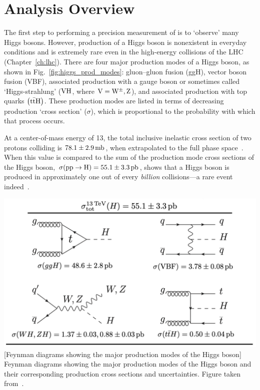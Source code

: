 \section{Analysis Overview}
\label{sec:analysis_overview}
The first step to performing a precision measurement of \mH is to `observe' many Higgs bosons.
However, production of a Higgs boson is nonexistent in everyday conditions and is extremely rare even in the high-energy \pp collisions of the LHC (Chapter~\ref{ch:lhc}).
There are four major production modes of a Higgs boson, as shown in Fig.~\ref{fig:higgs_prod_modes}:
gluon--gluon fusion (ggH),
vector boson fusion (VBF),
associated production with a gauge boson or sometimes called `Higgs-strahlung' ($\mathrm{V} \mathrm{H}$, where $\mathrm{V} = \mathrm{W}^\pm, \text{Z}$),
and associated production with top quarks $\left( \mathrm{t} \bar{\mathrm{t}} \mathrm{H} \right)$.
These production modes are listed in terms of decreasing production `cross section' ($\sigma$), which is proportional to the probability with which that process occurs.

At a center-of-mass energy of 13\TeV, the total inclusive inelastic cross section of two protons colliding is $78.1 \pm 2.9\,\text{mb}$, when extrapolated to the full phase space~\cite{ATLAS:2016ygv}.
When this value is compared to the sum of the production mode cross sections of the Higgs boson, $\sigma(\mathrm{p} \mathrm{p} \to \mathrm{H}) = 55.1 \pm 3.3\,\text{pb}$, shows that a Higgs boson is produced in approximately one out of every \emph{billion} \pp collisions---a rare event indeed~\cite{new_pdg_2022}.
\begin{multiFigure}
	\centering
	\includegraphics[width=\textwidth]{figures/higgsmassmeas/higgs_prod_modes.png}
		[Feynman diagrams showing the major production modes of the Higgs boson]
		{Feynman diagrams showing the major production modes of the Higgs boson and their corresponding production cross sections and uncertainties.
		Figure taken from~\cite{new_pdg_2022}.
		}
	\label{fig:higgs_prod_modes}
\end{multiFigure} 

